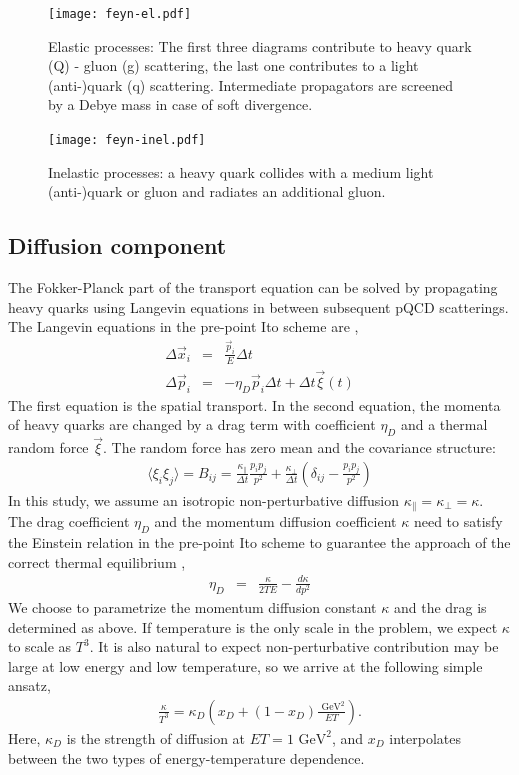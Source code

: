 \documentclass[aps, prc, reprint, amsmath, groupedaddress, nofootinbib]{revtex4-1}
\newcommand{\Kpara}{\kappa_{\|}}
\newcommand{\Kperp}{\kappa_{\perp}}
\begin{document}
\begin{figure}
\texttt{[image: feyn-el.pdf]}
\caption{Elastic processes: The first three diagrams contribute to heavy quark (Q) - gluon (g) scattering, the last one contributes to a light (anti-)quark (q) scattering. Intermediate propagators are screened by a Debye mass in case of soft divergence.}\label{plots:feyn-elastic}
\end{figure}

\begin{figure}
\texttt{[image: feyn-inel.pdf]}
\caption{Inelastic processes: a heavy quark collides with a medium light (anti-)quark or gluon and radiates an additional gluon.}\label{plots:feyn-inelastic}
\end{figure}

\subsection{Diffusion component}
The Fokker-Planck part of the transport equation can be solved by propagating heavy quarks using Langevin equations in between subsequent pQCD scatterings.
The Langevin equations in the pre-point Ito scheme are \cite{Rapp:2009my},
\begin{eqnarray}
\Delta \vec{x}_i &=& \frac{\vec{p}_i}{E} \Delta t	\\
\Delta \vec{p}_i &=& -\eta_D \vec{p}_i \Delta t + \Delta t \vec{\xi}(t)
\end{eqnarray}
The first equation is the spatial transport.
In the second equation, the momenta of heavy quarks are changed by a drag term with coefficient $\eta_D$ and a thermal random force $\vec{\xi}$. 
The random force has zero mean and the covariance structure:
\begin{eqnarray}
\langle \xi_i \xi_j \rangle = B_{ij} = \frac{\Kpara}{\Delta t} \frac{p_i p_j}{p^2} + \frac{\Kperp}{\Delta t} \left(\delta_{ij} - \frac{p_i p_j}{p^2}\right)
\end{eqnarray}
In this study, we assume an isotropic non-perturbative diffusion $\Kpara=\Kperp=\kappa$.
The drag coefficient $\eta_D$ and the momentum diffusion coefficient $\kappa$ need to satisfy the Einstein relation in the pre-point Ito scheme to guarantee the approach of the correct thermal equilibrium \cite{Rapp:2009my},
\begin{eqnarray}
\eta_D &=& \frac{\kappa}{2TE} - \frac{d\kappa}{dp^2}
\end{eqnarray}
We choose to parametrize the momentum diffusion constant $\kappa$ and the drag is determined as above.
If temperature is the only scale in the problem, we expect $\kappa$ to scale as $T^3$.
It is also natural to expect non-perturbative contribution may be large at low energy and low temperature, so we arrive at the following simple ansatz,
\begin{eqnarray}
\frac{\kappa}{T^3} = \kappa_D\left(x_D + (1-x_D)\frac{\textrm{ GeV}^2}{ET}\right).
\end{eqnarray}
Here, $\kappa_D$ is the strength of diffusion at $ET = 1\textrm{ GeV}^2$, and $x_D$ interpolates between the two types of energy-temperature dependence.
\end{document}
